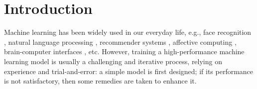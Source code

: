 \documentclass[journal,twocolumn]{IEEEtran}
\begin{document}
\IEEEpeerreviewmaketitle

\section{Introduction}

Machine learning has been widely used in our everyday life, e.g., face recognition \cite{Zhao2003}, natural language processing \cite{Collobert2011}, recommender systems \cite{Wang2015b}, affective computing \cite{drwuVRST2010,drwuMTALR2021}, brain-computer interfaces \cite{drwuiGS2019,drwuEA2020}, etc. However, training a high-performance machine learning model is usually a challenging and iterative process, relying on experience and trial-and-error: a simple model is first designed; if its performance is not satisfactory, then some remedies are taken to enhance it.
\end{document}
